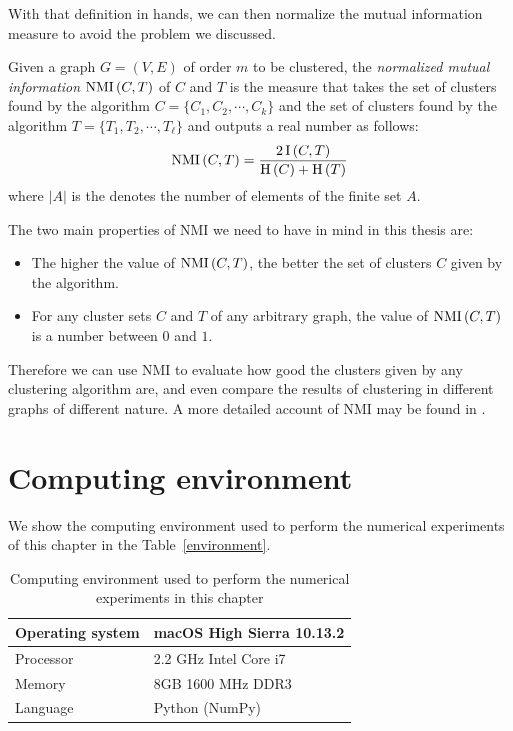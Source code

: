 With that definition in hands, we can then normalize the mutual information measure to avoid the problem we discussed.

\begin{definition}
   Given a graph $G = (V,E)$ of order $m$ to be clustered, the \textit{normalized mutual information} $\operatorname{NMI\,} (C, T)$ of $C$ and $T$ is the measure that takes the set of clusters found by the algorithm $C = \{ C_1, C_2, \cdots, C_k \}$ and the set of clusters found by the algorithm $T = \{ T_1, T_2, \cdots, T_\ell \}$ and outputs a real number as follows:
\begin{equation}
   \operatorname{NMI\,} (C,T) = \frac{2\operatorname{I\,} (C,T)}{\operatorname{H\,} (C) + \operatorname{H\,} (T)}
\end{equation}
where $|A|$ is the denotes the number of elements of the finite set $A$.
\end{definition}

The two main properties of NMI we need to have in mind in this thesis are:

\begin{itemize}
   \item The higher the value of $\operatorname{NMI\,} (C,T)$, the better the set of clusters $C$ given by the algorithm.
   \item For any cluster sets $C$ and $T$ of any arbitrary graph, the value of $\operatorname{NMI\,} (C,T)$ is a number between $0$ and $1$. 
\end{itemize}

Therefore we can use NMI to evaluate how good the clusters given by any clustering algorithm are, and even compare the results of clustering in different graphs of different nature.
A more detailed account of NMI may be found in \cite{nmi}.

\section{Computing environment}
We show the computing environment used to perform the numerical experiments of this chapter in the Table~\vref{environment}.

\begin{table}[h]
\centering
\caption{Computing environment used to perform the numerical experiments in this chapter}
\label{environment}
\begin{tabular}{l|l}
\hline
Operating system & macOS High Sierra 10.13.2 \\ \hline
Processor        & 2.2 GHz Intel Core i7     \\ \hline
Memory           & 8GB 1600 MHz DDR3         \\ \hline
Language         & Python (NumPy)            \\ \hline
\end{tabular}
\end{table}

